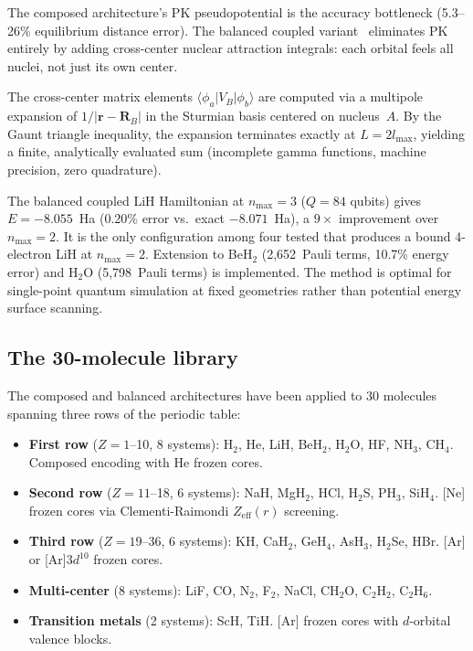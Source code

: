 \documentclass[aps,pra,twocolumn,superscriptaddress,longbibliography]{revtex4-2}
\begin{document}
The composed architecture's PK pseudopotential is the accuracy
bottleneck (5.3--26\% equilibrium distance error).  The balanced coupled
variant~\cite{Paper19} eliminates PK entirely by adding cross-center
nuclear attraction integrals: each orbital feels all nuclei, not just
its own center.

The cross-center matrix elements
$\langle \phi_a | V_B | \phi_b \rangle$ are computed via a multipole
expansion of $1/|\mathbf{r} - \mathbf{R}_B|$ in the Sturmian basis
centered on nucleus~$A$.  By the Gaunt triangle inequality, the
expansion terminates exactly at $L = 2l_{\max}$, yielding a finite,
analytically evaluated sum (incomplete gamma functions, machine
precision, zero quadrature).

The balanced coupled LiH Hamiltonian at $n_{\max} = 3$ ($Q = 84$
qubits) gives $E = -8.055$~Ha (0.20\% error vs.\ exact $-8.071$~Ha),
a $9\times$ improvement over $n_{\max} = 2$.  It is the only
configuration among four tested that produces a bound 4-electron LiH
at $n_{\max} = 2$.  Extension to BeH$_2$ (2,652~Pauli terms, 10.7\%
energy error) and H$_2$O (5,798~Pauli terms) is implemented.  The
method is optimal for single-point quantum simulation at fixed
geometries rather than potential energy surface scanning.

\subsection{The 30-molecule library}

The composed and balanced architectures have been applied to 30
molecules spanning three rows of the periodic table:
\begin{itemize}
\item \textbf{First row} ($Z = 1$--10, 8 systems): H$_2$, He, LiH,
  BeH$_2$, H$_2$O, HF, NH$_3$, CH$_4$.  Composed encoding with He
  frozen cores.
\item \textbf{Second row} ($Z = 11$--18, 6 systems): NaH, MgH$_2$,
  HCl, H$_2$S, PH$_3$, SiH$_4$.  [Ne] frozen cores via
  Clementi-Raimondi $Z_{\text{eff}}(r)$ screening.
\item \textbf{Third row} ($Z = 19$--36, 6 systems): KH, CaH$_2$,
  GeH$_4$, AsH$_3$, H$_2$Se, HBr.  [Ar] or [Ar]$3d^{10}$ frozen
  cores.
\item \textbf{Multi-center} (8 systems): LiF, CO, N$_2$, F$_2$,
  NaCl, CH$_2$O, C$_2$H$_2$, C$_2$H$_6$.
\item \textbf{Transition metals} (2 systems): ScH, TiH.  [Ar] frozen
  cores with $d$-orbital valence blocks.
\end{itemize}
\end{document}

